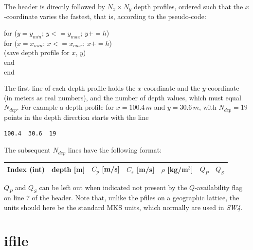 \documentclass[11pt]{report}
\begin{document}
The header is directly followed by $N_{x}\times N_{y}$ depth profiles, ordered such that the $x$-coordinate
varies the fastest, that is, according to the pseudo-code:
\begin{flushleft}
\hspace{10mm}  for ($y= y_{min}$; $y <= y_{max}$; $y += h$)\\
\hspace{20mm}    for ($x= x_{min}$; $x <= x_{max}$; $x += h$)\\
\hspace{30mm}      (save depth profile for $x$, $y$)\\
\hspace{20mm}    end\\
\hspace{10mm}  end
\end{flushleft}
The first line of each depth profile holds the $x$-coordinate and the $y$-coordinate (in meters as real
numbers), and the number of depth values, which must equal $N_{dep}$. For example a depth profile
for $x=100.4\,m$ and $y=30.6\,m$, with $N_{dep}=19$ points in the depth direction starts with the line
\begin{verbatim}
100.4  30.6  19
\end{verbatim}
The subsequent $N_{dep}$ lines have the following format:
\begin{center}
\begin{tabular}{lllllll}\hline
Index (int)& depth [m] & $C_p$ [m/s] &  $C_s$ [m/s] & $\rho$ [kg/m$^3$] & $Q_P$ & $Q_S$ \\ \hline
\end{tabular}
\end{center}
$Q_P$ and $Q_S$ can be left out when indicated not present by the $Q$-availability flag on line 7 of
the header.  Note that, unlike the pfiles on a geographic lattice, the units should here be
the standard MKS units, which normally are used in \emph{SW4}.

\section{ifile}\label{sec:ifile-format}
\end{document}
